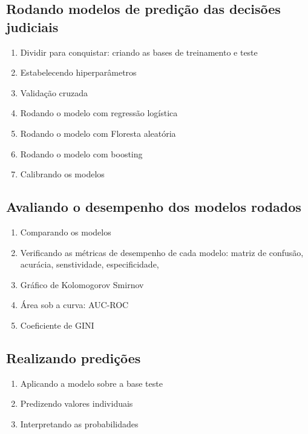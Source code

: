 \documentclass[12pt,]{article}
\providecommand{\tightlist}{%
  \setlength{\itemsep}{0pt}\setlength{\parskip}{0pt}}
\begin{document}
\subsection{Rodando modelos de predição das decisões
judiciais}\label{rodando-modelos-de-predicao-das-decisoes-judiciais}

\begin{enumerate}
\def\labelenumi{\arabic{enumi}.}
\tightlist
\item
  Dividir para conquistar: criando as bases de treinamento e teste
\item
  Estabelecendo hiperparâmetros
\item
  Validação cruzada
\item
  Rodando o modelo com regressão logística
\item
  Rodando o modelo com Floresta aleatória
\item
  Rodando o modelo com boosting
\item
  Calibrando os modelos
\end{enumerate}

\subsection{Avaliando o desempenho dos modelos
rodados}\label{avaliando-o-desempenho-dos-modelos-rodados}

\begin{enumerate}
\def\labelenumi{\arabic{enumi}.}
\tightlist
\item
  Comparando os modelos
\item
  Verificando as métricas de desempenho de cada modelo: matriz de
  confusão, acurácia, senstividade, especificidade,
\item
  Gráfico de Kolomogorov Smirnov
\item
  Área sob a curva: AUC-ROC
\item
  Coeficiente de GINI
\end{enumerate}

\subsection{Realizando predições}\label{realizando-predicoes}

\begin{enumerate}
\def\labelenumi{\arabic{enumi}.}
\tightlist
\item
  Aplicando a modelo sobre a base teste
\item
  Predizendo valores individuais
\item
  Interpretando as probabilidades
\end{enumerate}
\end{document}
